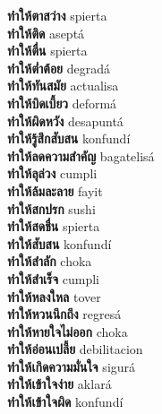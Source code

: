 \textbf{ ทำให้ตาสว่าง  } spierta \\
\textbf{ ทำให้ติด  } aseptá \\
\textbf{ ทำให้ตื่น  } spierta \\
\textbf{ ทำให้ต่ำต้อย  } degradá \\
\textbf{ ทำให้ทันสมัย  } actualisa \\
\textbf{ ทำให้บิดเบี้ยว  } deformá \\
\textbf{ ทำให้ผิดหวัง  } desapuntá \\
\textbf{ ทำให้รู้สึกสับสน  } konfundí \\
\textbf{ ทำให้ลดความสำคัญ  } bagatelisá \\
\textbf{ ทำให้ลุล่วง  } cumpli \\
\textbf{ ทำให้ล้มละลาย  } fayit \\
\textbf{ ทำให้สกปรก  } sushi \\
\textbf{ ทำให้สดชื่น  } spierta \\
\textbf{ ทำให้สับสน  } konfundí \\
\textbf{ ทำให้สำลัก  } choka \\
\textbf{ ทำให้สำเร็จ  } cumpli \\
\textbf{ ทำให้หลงใหล  } tover \\
\textbf{ ทำให้หวนนึกถึง  } regresá \\
\textbf{ ทำให้หายใจไม่ออก  } choka \\
\textbf{ ทำให้อ่อนเปลี้ย  } debilitacion \\
\textbf{ ทำให้เกิดความมั่นใจ  } sigurá \\
\textbf{ ทำให้เข้าใจง่าย  } aklará \\
\textbf{ ทำให้เข้าใจผิด  } konfundí \\
